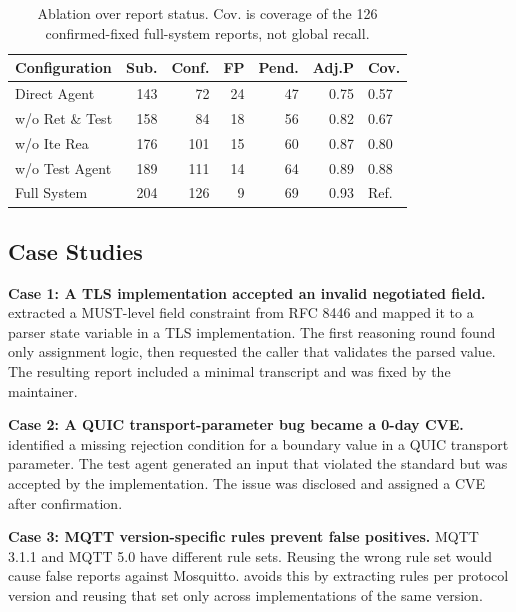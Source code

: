 \begin{table}[t]
\centering
\caption{Ablation over report status. Cov. is coverage of the 126
confirmed-fixed full-system reports, not global recall.}
\label{tab:ablation}
\small
\setlength{\tabcolsep}{4pt}
\begin{tabular}{lrrrrrl}
\toprule
\textbf{Configuration}
& \textbf{Sub.}
& \textbf{Conf.}
& \textbf{FP}
& \textbf{Pend.}
& \textbf{Adj.P}
& \textbf{Cov.} \\
\midrule
Direct Agent
& 143 & 72  & 24 & 47 & 0.75 & 0.57 \\

w/o Ret \& Test
& 158 & 84  & 18 & 56 & 0.82 & 0.67 \\

w/o Ite Rea
& 176 & 101 & 15 & 60 & 0.87 & 0.80 \\

w/o Test Agent
& 189 & 111 & 14 & 64 & 0.89 & 0.88 \\

Full System
& 204 & 126 & 9  & 69 & 0.93 & Ref. \\
\bottomrule
\end{tabular}
\end{table}

\subsection{Case Studies}

\textbf{Case 1: A TLS implementation accepted an invalid negotiated field.}
\tool{} extracted a MUST-level field constraint from RFC 8446 and mapped it to
a parser state variable in a TLS implementation. The first reasoning round
found only assignment logic, then requested the caller that validates the parsed
value. The resulting report included a minimal transcript and was fixed by the
maintainer.

\textbf{Case 2: A QUIC transport-parameter bug became a 0-day CVE.}
\tool{} identified a missing rejection condition for a boundary value in a QUIC
transport parameter. The test agent generated an input that violated the
standard but was accepted by the implementation. The issue was disclosed and
assigned a CVE after confirmation.

\textbf{Case 3: MQTT version-specific rules prevent false positives.}
MQTT 3.1.1 and MQTT 5.0 have different rule sets. Reusing the wrong rule set
would cause false reports against Mosquitto. \tool{} avoids this by extracting
rules per protocol version and reusing that set only across implementations of
the same version.

